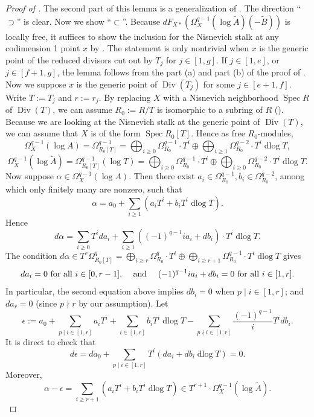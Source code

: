\documentclass[11pt]{amsart}
\newcommand{\Spec}{\operatorname{Spec}}
\newcommand{\Div}{\operatorname{Div}}
\newcommand{\dlog}{\operatorname{dlog}}
\renewcommand{\tilde}{\widetilde}
\theoremstyle{plain}
\theoremstyle{definition}
\numberwithin{equation}{prop}
\begin{document}
\begin{proof}[Proof of ]
The second part of this lemma is a generalization of \cite[Lemma 8.10]{RamFil1}.
The direction ``$\supset$'' is clear.
Now we show ``$\subset$''.
Because $dF_{X*}(\Omega^{q-1}_X(\log \tilde A)(-\tilde B))$ is locally free,
it suffices to show the inclusion for the Nisnevich stalk at any codimension 1 point $x$ by .
The statement is only nontrivial when $x$ is the generic point of the reduced divisors cut out by $T_j$ for $j\in [1,g]$.
If $j\in [1,e]$, or $j\in [f+1,g]$, the lemma follows from the part (a) and part (b) of the proof of \cite[Lemma 8.10]{RamFil1}.
Now we suppose $x$ is the generic point of $\Div (T_j)$ for some $j\in [e+1,f]$.
Write $T:=T_j$ and $r:=r_j$. 
By replacing $X$ with a Nisnevich neighborhood $\Spec R$ of $\Div(T)$, we can assume $R_0:=R/T$ is isomorphic to a subring of $R$ (\cite[Lemma 7.14]{BRS}).
Because we are looking at the Nisnevich stalk at the generic point of $\Div(T)$, we can assume that $X$ is of the form $\Spec R_0[T]$.
Hence as free $R_0$-modules, 
$$
\Omega^{q-1}_X(\log A)=\Omega^{q-1}_{R_0[T]}=
\bigoplus_{i\ge 0} \Omega^{q-1}_{R_0}\cdot T^i
\oplus 
\bigoplus_{i\ge 1} \Omega^{q-2}_{R_0} \cdot T^i\dlog T,
$$
$$\Omega^{q-1}_X(\log \tilde A)=\Omega^{q-1}_{R_0[T]}(\log T)=
\bigoplus_{i\ge 0} \Omega^{q-1}_{R_0}\cdot T^i
\oplus 
\bigoplus_{i\ge 0} \Omega^{q-2}_{R_0} \cdot T^i\dlog T.$$
Now suppose $\alpha\in \Omega^{q-1}_{X}(\log A)$.
Then there exist
$a_i\in \Omega^{q-1}_{R_0}, b_i\in \Omega^{q-2}_{R_0}$, among which only finitely many are nonzero, such that
$$\alpha=a_0+ \sum_{i\ge 1} (a_iT^i+ b_iT^i\dlog T).$$
Hence
$$d\alpha=\sum_{i\ge 0}T^ida_i+\sum_{i\ge 1}((-1)^{q-1}ia_{i}+ db_i)\cdot T^{i}\dlog T.$$
The condition $d\alpha\in T^r \Omega^q_{R_0[T]}
=\bigoplus_{i\ge r} \Omega^q_{R_0}\cdot T^{i}\oplus \bigoplus_{i\ge r+1} \Omega^{q-1}_{R_0} \cdot T^{i}\dlog T$ 
gives
$$da_i=0\text{  for all $i\in [0,r-1],$
\quad and 
\quad 
$(-1)^{q-1}ia_{i}+db_i=0$ for all $i\in [1,r]$.}$$
In particular, the second equation above implies $db_i=0$ when $p\mid i\in [1,r]$; and $da_r=0$ (since $p\nmid r$ by our assumption).
Let 
$$\epsilon:= a_0+\sum_{p\mid i\in [1,r]} a_iT^i+ \sum_{i\in [1,r]} b_iT^i\dlog T
-\sum_{p\nmid i\in [1,r]} \frac{(-1)^{q-1}}{i} T^idb_i.$$
It is direct to check that 
$$d\epsilon=da_0+\sum_{p\mid i\in [1,r]} T^i\left(da_i+db_i\dlog T\right)=0.$$
Moreover,
$$\alpha-\epsilon
=
\sum_{i\ge r+1}(a_iT^i+b_iT^i \dlog T)
\in T^{r+1}\cdot \Omega^{q-1}_X(\log \tilde A).$$
\end{proof}
\end{document}
